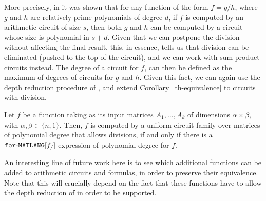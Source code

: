 More precisely, in \cite{strassen1973vermeidung,borodin1982fast,kaltofen1988greatest} it was shown that for any function of the form $f = g/h$, where $g$ and $h$ are relatively prime polynomials of degree $d$, if $f$ is computed by an arithmetic circuit of size $s$, then both $g$ and $h$ can be computed by a circuit whose size is polynomial in $s + d$. Given that we can postpone the division without affecting the final result, this, in essence, tells us that division can be eliminated (pushed to the top of the circuit), and we can work with sum-product circuits instead. The degree of a circuit for $f$, can then be defined as the maximum of degrees of circuits for $g$ and $h$. Given this fact, we can again use the depth reduction procedure of \cite{AllenderJMV98}, and extend Corollary~\ref{th-equivalence} to circuits with division.
\begin{corollary}
\label{cor-division}
Let $f$ be a function taking as its input matrices $A_1,\ldots ,A_k$ of dimensions $\alpha\times \beta$, with $\alpha,\beta \in \{n,1\}$. Then, $f$ is computed by a uniform circuit family over matrices of polynomial degree that allows divisions, if and only if there is a $\texttt{for}\text{-}\texttt{MATLANG}[f_/]$ expression of polynomial degree for $f$.
\end{corollary}

An interesting line of future work here is to see which additional functions can be added to arithmetic circuits and \langfor formulas, in order to preserve their equivalence. Note that this will crucially depend on the fact that these functions have to allow the depth reduction of \cite{AllenderJMV98} in order to be supported.
